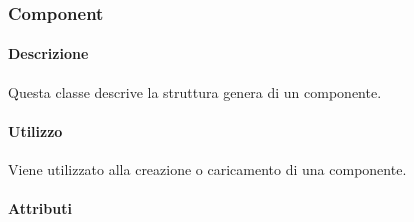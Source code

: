 \subsubsection{Component}


	\paragraph{Descrizione}
	Questa classe descrive la struttura genera di un componente.
	
	\paragraph{Utilizzo}
	Viene utilizzato alla creazione o caricamento di una componente.
	
	\paragraph{Attributi}
